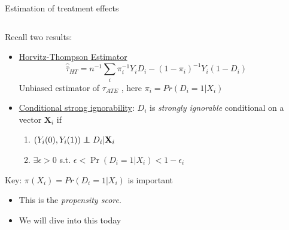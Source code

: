\documentclass[notes,11pt, aspectratio=169]{beamer}
\newcommand\independent{\protect\mathpalette{\protect\independenT}{\perp}}
\def\independenT#1#2{\mathrel{\rlap{$#1#2$}\mkern2mu{#1#2}}}
\newenvironment{wideitemize}{\itemize\addtolength{\itemsep}{10pt}}{\enditemize}
\begin{document}
\begin{frame}{Estimation of treatment effects}
\begin{columns}[T] %
\begin{column}{.65\textwidth}
  \begin{wideitemize}
  \item Recall two results:
    \begin{itemize}
    \item \underline{Horvitz-Thompson Estimator}
      \begin{equation*}
        \hat{\bar{\tau}}_{HT} = n^{-1}\sum_{i}\pi^{-1}_{i}Y_{i}D_{i} - (1-\pi_{i})^{-1}Y_{i}(1-D_{i})
      \end{equation*}
      Unbiased estimator of $\tau_{ATE}$ , here $\pi_{i} = Pr(D_{i} = 1 | X_{i})$
    \item \underline{Conditional strong ignorability}: $D_{i}$ is \emph{strongly
        ignorable} conditional on a vector $\mathbf{X}_{i}$ if
    \begin{enumerate}
    \item $(Y_{i}(0), Y_{i}(1)) \independent D_{i} | \mathbf{X}_{i} $
    \item $\exists \epsilon > 0$ s.t. $\epsilon < \Pr(D_{i} = 1 | X_{i}) < 1-\epsilon_{i}$
    \end{enumerate}
  \end{itemize}
\item Key: $\pi(X_{i}) = Pr(D_{i} = 1 | X_{i})$ is important
  \begin{itemize}
  \item This is the \emph{propensity score}.
  \item We will dive into this today
  \end{itemize}
  \end{wideitemize}
\end{column}%
\hfill%
\begin{column}{.4\textwidth}

\end{column}%
\end{columns}
\end{frame}
\end{document}
